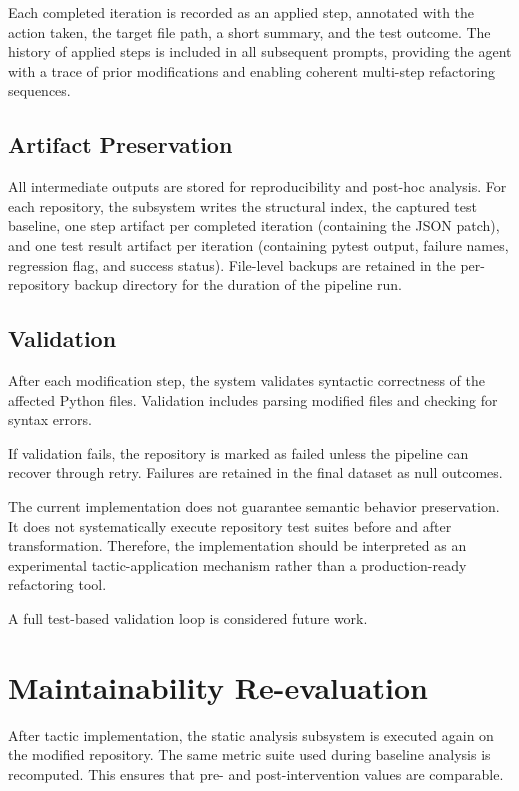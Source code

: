 Each completed iteration is recorded as an applied step, annotated with the action taken, the target file path, a short summary, and the test outcome. The history of applied steps is included in all subsequent prompts, providing the agent with a trace of prior modifications and enabling coherent multi-step refactoring sequences.

\subsection{Artifact Preservation}
\label{subsec:impl_artifacts}

All intermediate outputs are stored for reproducibility and post-hoc analysis. For each repository, the subsystem writes the structural index, the captured test baseline, one step artifact per completed iteration (containing the JSON patch), and one test result artifact per iteration (containing pytest output, failure names, regression flag, and success status). File-level backups are retained in the per-repository backup directory for the duration of the pipeline run.


\subsection{Validation}

After each modification step, the system validates syntactic correctness of the affected Python files. Validation includes parsing modified files and checking for syntax errors.

If validation fails, the repository is marked as failed unless the pipeline can recover through retry. Failures are retained in the final dataset as null outcomes.

The current implementation does not guarantee semantic behavior preservation. It does not systematically execute repository test suites before and after transformation. Therefore, the implementation should be interpreted as an experimental tactic-application mechanism rather than a production-ready refactoring tool.

A full test-based validation loop is considered future work.

\section{Maintainability Re-evaluation}

After tactic implementation, the static analysis subsystem is executed again on the modified repository. The same metric suite used during baseline analysis is recomputed. This ensures that pre- and post-intervention values are comparable.

